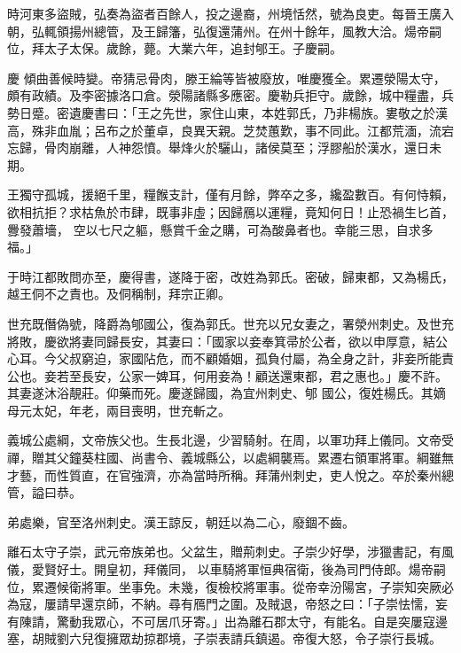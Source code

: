 \begin{pinyinscope}
 時河東多盜賊，弘奏為盜者百餘人，投之邊裔，州境恬然，號為良吏。每晉王廣入朝，弘輒領揚州總管，及王歸籓，弘復還蒲州。在州十餘年，風教大洽。煬帝嗣位，拜太子太保。歲餘，薨。大業六年，追封郇王。子慶嗣。



 慶
 傾曲善候時變。帝猜忌骨肉，滕王綸等皆被廢放，唯慶獲全。累遷滎陽太守，頗有政績。及李密據洛口倉。滎陽諸縣多應密。慶勒兵拒守。歲餘，城中糧盡，兵勢日蹙。密遺慶書曰：「王之先世，家住山東，本姓郭氏，乃非楊族。婁敬之於漢高，殊非血胤；呂布之於董卓，良異天親。芝焚蕙歎，事不同此。江都荒湎，流宕忘歸，骨肉崩離，人神怨憤。舉烽火於驪山，諸侯莫至；浮膠船於漢水，還日未期。



 王獨守孤城，援絕千里，糧餱支計，僅有月餘，弊卒之多，纔盈數百。有何恃賴，欲相抗拒？求枯魚於市肆，既事非虛；因歸鴈以運糧，竟知何日！止恐禍生匕首，釁發蕭墻，
 空以七尺之軀，懸賞千金之購，可為酸鼻者也。幸能三思，自求多福。」



 于時江都敗問亦至，慶得書，遂降于密，改姓為郭氏。密破，歸東都，又為楊氏，越王侗不之責也。及侗稱制，拜宗正卿。



 世充既僭偽號，降爵為郇國公，復為郭氏。世充以兄女妻之，署滎州刺史。及世充將敗，慶欲將妻同歸長安，其妻曰：「國家以妾奉箕帚於公者，欲以申厚意，結公心耳。今父叔窮迫，家國阽危，而不顧婚姻，孤負付屬，為全身之計，非妾所能責公也。妾若至長安，公家一婢耳，何用妾為！顧送還東都，君之惠也。」慶不許。其妻遂沐浴靚莊。仰藥而死。慶遂歸國，為宜州刺史、郇
 國公，復姓楊氏。其嫡母元太妃，年老，兩目喪明，世充斬之。



 義城公處綱，文帝族父也。生長北邊，少習騎射。在周，以軍功拜上儀同。文帝受禪，贈其父鐘葵柱國、尚書令、義城縣公，以處綱襲焉。累遷右領軍將軍。綱雖無才藝，而性質直，在官強濟，亦為當時所稱。拜蒲州刺史，吏人悅之。卒於秦州總管，謚曰恭。



 弟處樂，官至洛州刺史。漢王諒反，朝廷以為二心，廢錮不齒。



 離石太守子崇，武元帝族弟也。父盆生，贈荊刺史。子崇少好學，涉獵書記，有風儀，愛賢好士。開皇初，拜儀同，
 以車騎將軍恒典宿衛，後為司門侍郎。煬帝嗣位，累遷候衛將軍。坐事免。未幾，復檢校將軍事。從帝幸汾陽宮，子崇知突厥必為寇，屢請早還京師，不納。尋有鴈門之圍。及賊退，帝怒之曰：「子崇怯懦，妄有陳請，驚動我眾心，不可居爪牙寄。」出為離石郡太守，有能名。自是突屢寇邊塞，胡賊劉六兒復擁眾劫掠郡境，子崇表請兵鎮遏。帝復大怒，令子崇行長城。




\end{pinyinscope}
